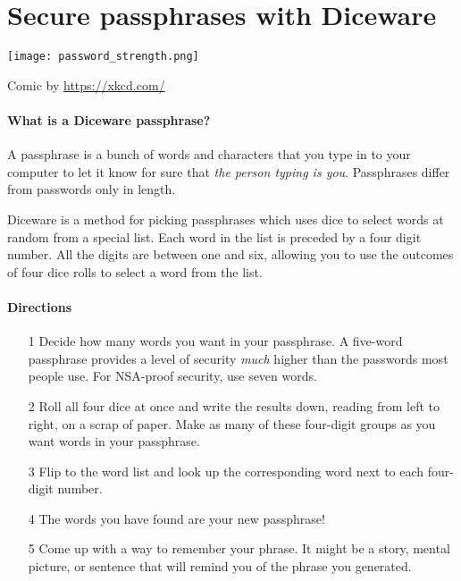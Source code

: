 \chapter*{Secure passphrases with Diceware}
\label{ch:diceware}

\vspace{-.2in}
\texttt{[image: password\_strength.png]}

\vspace{-.125in}
\begin{tiny}
	\begin{center}
		Comic by \url{https://xkcd.com/} \ccbync 
	\end{center}
\end{tiny}

\newpage
\setlength{\parindent}{0em}
\setlength{\parskip}{0.5em}

\subsubsection*{What is a Diceware passphrase?}

A passphrase is a bunch of words and characters that you type in to your computer to let it know for sure that \textit{the person typing is you}. Passphrases differ from passwords only in length.

Diceware is a method for picking passphrases which uses dice to select words at random from a special list. Each word in the list is preceded by a four digit number. All the digits are between one and six, allowing you to use the outcomes of four dice rolls to select a word from the list.

\subsubsection*{Directions}

\begin{itemize}[leftmargin=*]

\item[1] Decide how many words you want in your passphrase. A five-word passphrase provides a level of security \textit{much} higher than the passwords most people use. For NSA-proof security, use seven words.

\item[2] Roll all four dice at once and write the results down, reading from left to right, on a scrap of paper. Make as many of these four-digit groups as you want words in your passphrase.

\item[3] Flip to the word list and look up the corresponding word next to each four-digit number.

\item[4] The words you have found are your new passphrase!

\item[5] Come up with a way to remember your phrase. It might be a story, mental picture, or sentence that will remind you of the phrase you generated.

\end{itemize}

